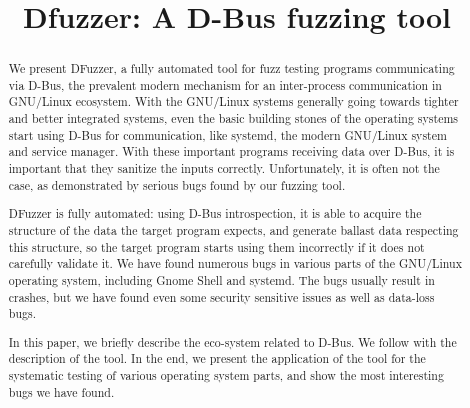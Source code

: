 \documentclass[conference]{IEEEtran}
\begin{document}
%
\title{\textbf{Dfuzzer: A D-Bus fuzzing tool}}


\author{
}

\maketitle


\begin{abstract}
We present DFuzzer, a fully automated tool for fuzz testing
programs communicating via D-Bus, the prevalent modern mechanism for an
inter-process communication in GNU/Linux ecosystem. With the GNU/Linux systems
generally going towards tighter and better integrated systems, even the basic
building stones of the operating systems start using D-Bus for communication,
like systemd, the modern GNU/Linux system and service manager. With these
important programs receiving data over D-Bus, it is important that they
sanitize the inputs correctly. Unfortunately, it is often not the case, as
demonstrated by serious bugs found by our fuzzing tool.

DFuzzer is fully automated: using D-Bus introspection, it is able to acquire
the structure of the data the target program expects, and generate ballast
data respecting this structure, so the target program starts using them
incorrectly if it does not carefully validate it. We have found numerous bugs
in various parts of the GNU/Linux operating system, including Gnome Shell and
systemd. The bugs usually result in crashes, but we have found even some
security sensitive issues as well as data-loss bugs.

In this paper, we briefly describe the eco-system related to D-Bus. We follow
with the description of the tool. In the end, we present the application of the
tool for the systematic testing of various operating system parts, and show the
most interesting bugs we have found.

\end{abstract}
\end{document}
